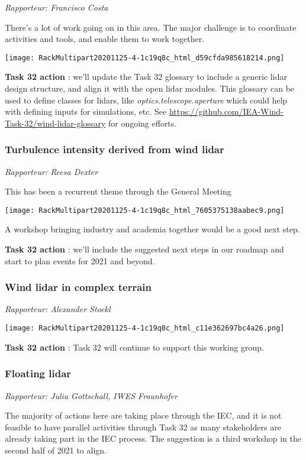 \emph{Rapporteur: Francisco Costa}

There's a lot of work going on in this area. The major challenge is to
coordinate activities and tools, and enable them to work together.

\texttt{[image: RackMultipart20201125-4-1c19q8c\_html\_d59cfda985618214.png]}

\textbf{Task 32 action} : we'll update the Task 32 glossary to include a
generic lidar design structure, and align it with the open lidar
modules. This glossary can be used to define classes for lidars, like
\emph{optics.telescope.aperture} which could help with defining inputs
for simulations, etc. See
\href{https://github.com/IEA-Wind-Task-32/wind-lidar-glossary}{\url{https://github.com/IEA-Wind-Task-32/wind-lidar-glossary}}
for ongoing efforts.

\subsubsection{Turbulence intensity derived from wind lidar}

\emph{Rapporteur: Reesa Dexter}

This has been a recurrent theme through the General Meeting

\texttt{[image: RackMultipart20201125-4-1c19q8c\_html\_7605375138aabec9.png]}

A workshop bringing industry and academia together would be a good next step.

\textbf{Task 32 action} : we'll include the suggested next steps in our
roadmap and start to plan events for 2021 and beyond.

\subsubsection{Wind lidar in complex terrain}

\emph{Rapporteur: Alexander Stoekl}

\texttt{[image: RackMultipart20201125-4-1c19q8c\_html\_c11e362697bc4a26.png]}


\textbf{Task 32 action} : Task 32 will continue to support this working
group.

\subsubsection{Floating lidar}

\emph{Rapporteur: Julia Gottschall, IWES Fraunhofer}

The majority of actions here are taking place through the IEC, and it is
not feasible to have parallel activities through Task 32 as many
stakeholders are already taking part in the IEC process. The suggestion
is a third workshop in the second half of 2021 to align.

